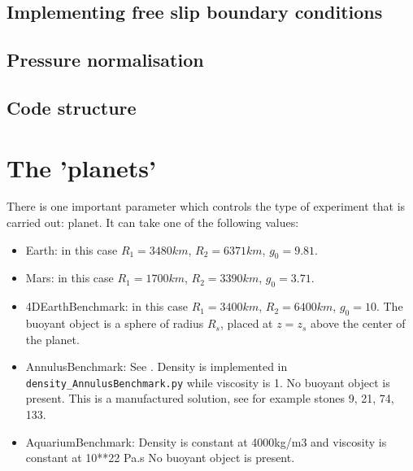 \documentclass[a4paper,12pt]{article}
\newcommand{\python}{\color{teal} \sffamily }
\begin{document}
\subsection{Implementing free slip boundary conditions}


\subsection{Pressure normalisation}


\newpage
\subsection{Code structure}




\newpage
\section{The 'planets'}

There is one important parameter which controls the type of experiment that is carried
out: {\python planet}.
It can take one of the following values:

\begin{itemize}
\item {\python Earth}: in this case $R_1=3480km$, $R_2=6371km$, $g_0=9.81$.


\item {\python Mars}: in this case $R_1=1700km$, $R_2=3390km$, $g_0=3.71$.


\item {\python 4DEarthBenchmark}: in this case $R_1=3400km$, $R_2=6400km$, $g_0=10$.
The buoyant object is a sphere of radius $R_s$, placed at $z=z_s$ above the 
center of the planet. 

 
\item {\python AnnulusBenchmark}: See \textcite{gadb24}.
Density is implemented in {\tt density\_AnnulusBenchmark.py} 
while viscosity is 1.
No buoyant object is present.
This is a manufactured solution, see for example stones 9, 21, 74, 133.

\item {\python AquariumBenchmark}: Density is constant at 4000kg/m3 and 
viscosity is constant at 10**22 Pa.s
No buoyant object is present.
\end{itemize}
\end{document}
